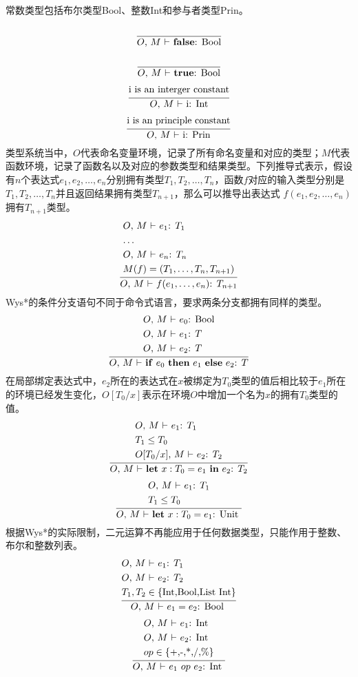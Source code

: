 常数类型包括布尔类型Bool、整数Int和参与者类型Prin。
\newcommand{\infertext}[2]{\infer{{\textrm{#2}}}{\begin{aligned}#1\end{aligned}}}
\[
\infertext {
\textrm{}}
{$O$, $M$ $\vdash$ \textbf{false}: Bool}
\]
\[
\infertext 
{\textrm{}}
{$O$, $M$ $\vdash$ \textbf{true}: Bool}
\]
\[
\infertext {\textrm{i is an interger constant}}{$O$, $M$ $\vdash$ i: Int}
\]
\[
\infertext {\textrm{i is an principle constant}}{$O$, $M$ $\vdash$ i: Prin}
\]
类型系统当中，$O$代表命名变量环境，记录了所有命名变量和对应的类型；$M$代表函数环境，记录了函数名以及对应的参数类型和结果类型。下列推导式表示，假设有$n$个表达式$e_1,e_2,\dots,e_n$分别拥有类型$T_1,T_2,\dots,T_n$，函数$f$对应的输入类型分别是$T_1,T_2,\dots,T_n$并且返回结果拥有类型$T_{n+1}$，那么可以推导出表达式 $f(e_1,e_2,\dots,e_n)$ 拥有$T_{n+1}$类型。
\[
\infertext {
&\textrm{$O$, $M$ $\vdash$ $e_1$: $T_1$}\\
&\textrm{\dots}\\
&\textrm{$O$, $M$ $\vdash$ $e_n$: $T_n$}\\
&\textrm{$M(f)=(T_1,\dots ,T_n,T_{n+1})$}
}{$O$, $M$ $\vdash$ $f(e_1,\dots ,e_n)$: $T_{n+1}$}
\]
Wys*的条件分支语句不同于命令式语言，要求两条分支都拥有同样的类型。
\[
\infertext {
&\textrm{$O$, $M$ $\vdash$ $e_0$: Bool}\\
&\textrm{$O$, $M$ $\vdash$ $e_1$: $T$}\\
&\textrm{$O$, $M$ $\vdash$ $e_2$: $T$}
}{$O$, $M$ $\vdash$ \textbf{if} $e_0$ \textbf{then} $e_1$ \textbf{else} $e_2$: $T$}
\]
在局部绑定表达式中，$e_2$所在的表达式在$x$被绑定为$T_0$类型的值后相比较于$e_1$所在的环境已经发生变化，$O[T_0/x]$表示在环境$O$中增加一个名为$x$的拥有$T_0$类型的值。
\[
\infertext {
&\textrm{$O$, $M$ $\vdash$ $e_1$: $T_1$}\\
&\textrm{$T_1 \leq T_0$}\\
&\textrm{$O[T_0 /x]$, $M$ $\vdash$ $e_2$: $T_2$}
}{$O$, $M$ $\vdash$ \textbf{let} $x:T_0 = e_1$ \textbf{in} $e_2$: $T_2$}
\]
\[
\infertext {
&\textrm{$O$, $M$ $\vdash$ $e_1$: $T_1$}\\
&\textrm{$T_1 \leq T_0$}
}{$O$, $M$ $\vdash$ \textbf{let} $x:T_0 = e_1$: Unit }
\]
根据Wys*的实际限制，二元运算不再能应用于任何数据类型，只能作用于整数、布尔和整数列表。
\[
\infertext {
&\textrm{$O$, $M$ $\vdash$ $e_1$: $T_1$}\\
&\textrm{$O$, $M$ $\vdash$ $e_2$: $T_2$}\\
&\textrm{$T_1,T_2 \in \{\text{Int,Bool,List Int}\}$}
}{$O$, $M$ $\vdash$ $e_1 = e_2$: Bool }
\]
\[
\infertext {
&\textrm{$O$, $M$ $\vdash$ $e_1$: Int}\\
&\textrm{$O$, $M$ $\vdash$ $e_2$: Int}\\
&\textrm{$op\in \{\text{+,-,*,/,\%}\}$}
}{$O$, $M$ $\vdash$ $e_1\ op\ e_2$: Int }
\]
